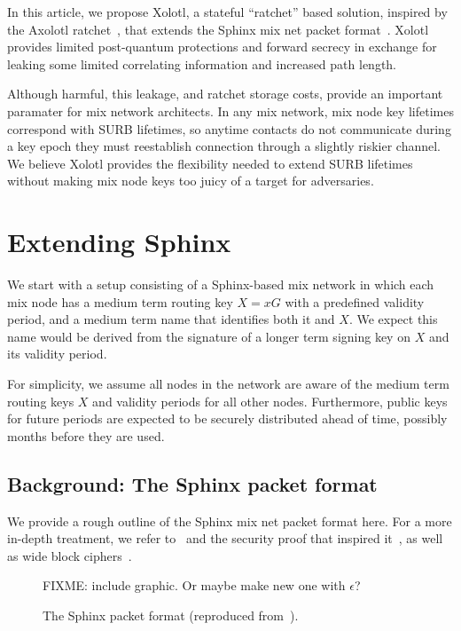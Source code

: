 \documentclass[twoside,letterpaper]{llncs}
\begin{document}
In this article, we propose Xolotl, a stateful ``ratchet'' based
solution, inspired by the Axolotl ratchet~\cite{TextSecure}, that
extends the Sphinx mix net packet format~\cite{Sphinx}.  
Xolotl provides limited post-quantum protections and forward secrecy
in exchange for leaking some limited correlating information and
increased path length.  

Although harmful, this leakage, and ratchet storage costs, provide an
important paramater for mix network architects.  In any mix network,
mix node key lifetimes correspond with SURB lifetimes, so anytime
contacts do not communicate during a key epoch they must reestablish
connection through a slightly riskier channel.  We believe Xolotl
provides the flexibility needed to extend SURB lifetimes without
making mix node keys too juicy of a target for adversaries.


\section{Extending Sphinx}

We start with a setup consisting of a Sphinx-based mix network in
which each mix node has a medium term routing key $X = x G$ with a
predefined validity period, and a medium term name that identifies
both it and $X$.  We expect this name would be derived from the
signature of a longer term signing key on $X$ and its validity period.

For simplicity, we assume all nodes in the network are aware of the
medium term routing keys $X$ and validity periods for all other nodes.
Furthermore, public keys for future periods are expected to be
securely distributed ahead of time, possibly months before they are
used.


\subsection{Background: The Sphinx packet format}

We provide a rough outline of the Sphinx mix net packet format here.
For a more in-depth treatment, we refer to~\cite{Sphinx} and the
security proof that inspired it~\cite{FormalOnion}, as well as wide
block ciphers~\cite{Lionness}.

\begin{figure}
  \begin{center}
     FIXME: include graphic. Or maybe make new one with $\epsilon$?
  \end{center}
  \caption{The Sphinx packet format (reproduced from~\cite{Sphinx}).}
  \label{fig:sphinx}
\end{figure}
\end{document}
